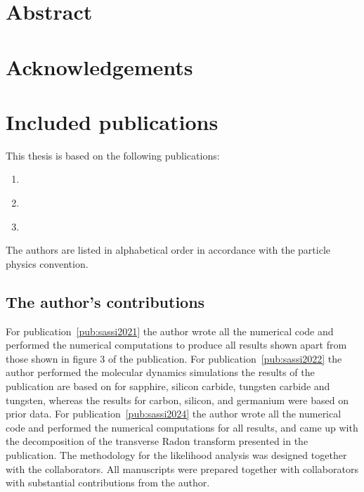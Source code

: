 \documentclass[b5paper, 10pt, twoside]{book}
\begin{document}

\tableofcontents

\chapter{Abstract}

\chapter{Acknowledgements}





\chapter{Included publications}

This thesis is based on the following publications:
\begin{enumerate}[label=\Roman*,ref=\Roman*]
\item\label{pub:sassi2021} 
\item\label{pub:sassi2022} 
\item\label{pub:sassi2024} 
\end{enumerate}
The authors are listed in alphabetical order in accordance with the particle physics convention.

\section*{The author's contributions}

For publication~\ref{pub:sassi2021} the author wrote all the numerical code and performed the numerical computations to produce all results shown apart from those shown in figure 3 of the publication. For publication~\ref{pub:sassi2022} the author performed the molecular dynamics simulations the results of the publication are based on for sapphire, silicon carbide, tungsten carbide and tungsten, whereas the results for carbon, silicon, and germanium were based on prior data. For publication~\ref{pub:sassi2024} the author wrote all the numerical code and performed the numerical computations for all results, and came up with the decomposition of the transverse Radon transform presented in the publication. The methodology for the likelihood analysis was designed together with the collaborators. All manuscripts were prepared together with collaborators with substantial contributions from the author.
\end{document}
